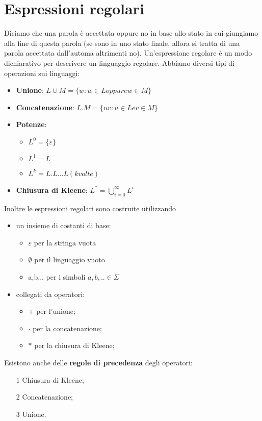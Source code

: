 \chapter{Espressioni regolari}
Diciamo che una parola è accettata oppure no in base allo stato in cui giungiamo alla
fine di questa parola (se sono in uno stato finale, allora si tratta di una parola accettata
dall'automa altrimenti no).
Un'espressione regolare è un modo dichiarativo per descrivere un linguaggio regolare.
Abbiamo diversi tipi di operazioni sui linguaggi:

\begin{itemize}
\item \textbf{Unione}: $L\cup M=\{w:w \in L oppure w \in M\}$
\item \textbf{Concatenazione}: $L.M=\{uv : u \in L e v \in M\}$
\item \textbf{Potenze}: 
	\begin{itemize}
	\item $L^{0}=\{\varepsilon\}$
	\item $L^{1}=L$   
	\item $L^{k}=L.L...L(k volte)$
	\end{itemize}
\item \textbf{Chiusura di Kleene}: $L^{\ast} = \bigcup_{i=0}^\infty L^{i}$
\end{itemize} 

Inoltre le espressioni regolari sono costruite utilizzando 

\begin{itemize}
\item un insieme di costanti di base:
	\begin{itemize}
	\item $\varepsilon$ per la stringa vuota
	\item $\emptyset$ per il linguaggio vuoto
	\item a,b,.. per i simboli $a,b,..\in \Sigma$
	\end{itemize}
\item collegati da operatori:
	\begin{itemize}
	\item $+$ per l'unione;
	\item $\cdot$ per la concatenazione;
	\item $\ast$ per la chiusura di Kleene;
	\end{itemize}
\end{itemize}

Esistono anche delle \textbf{regole di precedenza} degli operatori:
\begin{itemize}
\item[1]Chiusura di Kleene;
\item[2]Concatenazione;
\item[3]Unione.
\end{itemize}










